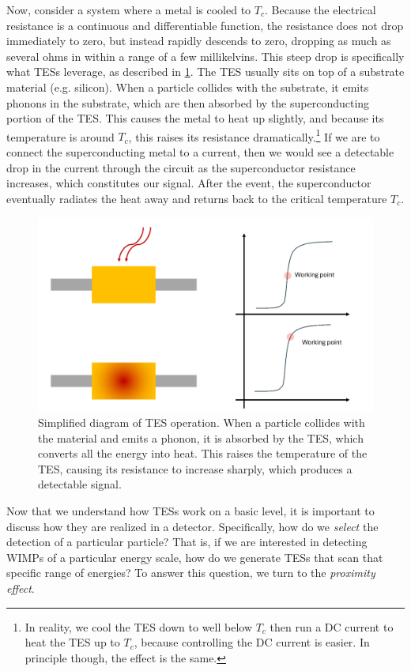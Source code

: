 Now, consider a system where a metal is cooled to \( T_c \). Because the electrical resistance is a
continuous and differentiable function, the resistance does not drop immediately to zero, but instead rapidly
descends to zero, dropping as much as several ohms in within a range of a few millikelvins. This steep drop
is specifically what TESs leverage, as described in \cref{tes-diagram}. The TES usually sits on top of a
substrate material (e.g. silicon). When a particle collides with the substrate, it emits phonons in the
substrate, which are then absorbed by the superconducting portion of the TES. This causes the metal to heat up
slightly, and because its temperature is around \( T_c \), this raises its resistance
dramatically.\footnote{In reality, we cool the TES down to well below \( T_c \) then run a DC current to heat
	the TES up to \( T_c \), because controlling the DC current is easier. In principle though, the effect is
the same.}
If we are
to connect the superconducting metal to a current, then we would see a detectable drop in the current through
the circuit as the superconductor resistance increases, which constitutes our signal. After the event,
the superconductor eventually radiates the heat away and returns back to the critical temperature \( T_c \).     
 
\begin{figure}
	\centering
	\includegraphics[scale=0.5]{images/TES.png}
	\caption{Simplified diagram of TES operation. When a particle collides with the material and emits a
	phonon, it is absorbed by the TES, which converts all the energy into heat. This raises the temperature
	of the TES, causing its resistance to increase sharply, which produces a detectable signal. }
	\label{tes-diagram}
\end{figure}

Now that we understand how TESs work on a basic level, it is important to discuss how they are realized in a
detector. Specifically, how do we \textit{select} the detection of a particular particle? That is, if we are
interested in detecting WIMPs of a particular energy scale, how do we generate TESs that scan that specific range of
energies? To answer this question, we turn to the \textit{proximity effect}. 


